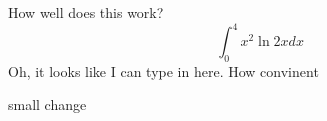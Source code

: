 \documentclass{article}
\begin{document}
How well does this work?
$$\int_0^4 x^2 \ln{2x}dx$$
Oh, it looks like I can type in here. 
How convinent

small change
\end{document}
